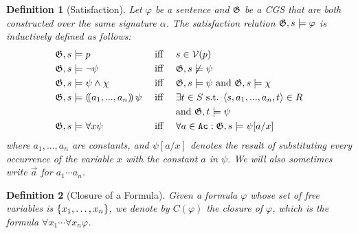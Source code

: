 \documentclass{article}
\newcommand\rustam[1]{\todo[color=blue!30,size=\small,inline]{Rustam: #1}}
\newcommand\davide[1]{\todo[color=green!30,size=\small,inline]{Davide: #1}}
\newtheorem{definition}{Definition}
\begin{document}
\begin{definition}[Satisfaction]
Let $\varphi$ be a sentence and $\mathfrak{G}$ be a CGS that are both constructed over the same signature $\alpha$. 
 The \emph{satisfaction relation} $\mathfrak{G},s\models \varphi$ is inductively defined %
as follows: 
    \begin{alignat*}{3}
        &\mathfrak{G},s\models p &&\text{ iff } &&s\in \mathcal{V}(p)\\
        &\mathfrak{G},s\models \neg \psi &&\text{ iff } &&\mathfrak{G},s\not\models \psi\\
        &\mathfrak{G},s\models \psi \land \chi &&\text{ iff } &&\mathfrak{G},s\models \psi \text{ and } \mathfrak{G},s\models \chi\\
        &\mathfrak{G},s\models (\!( {a_1},..., {a_n} )\!)\, \psi &&\text{ iff } &&\exists t \in S \text{ s.t. } \langle s, {a_1}, ..., {a_n},t \rangle\in R \\ & && &&\text{and }\mathfrak{G},t\models  \psi\\
        &\mathfrak{G},s\models \forall x \psi &&\text{ iff } &&\forall a \in \texttt{Ac}: \mathfrak{G},s\models \psi[{a}/x]
    \end{alignat*}
\noindent where $a_1,...,a_n$ are constants, and  $\psi[{a}/x]$ denotes 
the result of substituting every occurrence of the variable $x$ with the constant ${a}$ in $\psi$. We will also sometimes write $\vec a$ for $a_1\cdots a_n$.
\end{definition}  


\begin{definition}[Closure of a Formula]
\label{def:clos}
    Given a formula $\varphi$ whose set of free variables is $\{x_1,\ldots,x_n\}$, we denote by $C(\varphi)$ the \emph{closure} of $\varphi$, which is the formula $\forall x_1\cdots \forall x_n \varphi$. %
\end{definition}



\end{document}
